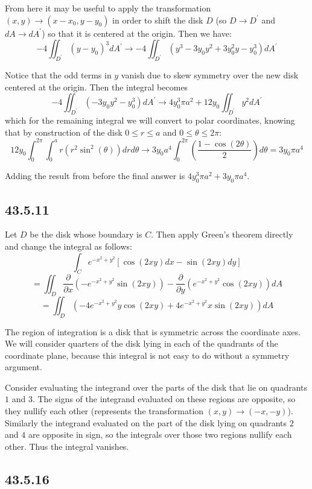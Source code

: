 \documentclass{article}
\begin{document}
From here it may be useful to apply the transformation $(x,y)\to (x-x_0,y-y_0)$ in order to shift the disk $D$ (so $D\to D^{\prime}$ and $dA \to dA^{\prime}$) so that it is centered at the origin. Then we have:
$$-4\iint_{D^{\prime}} (y-y_0)^3dA^{\prime} \to -4\iint_{D^{\prime}}(y^3 - 3 y_0 y^2 + 3 y_0^2 y - y_0^3)dA^{\prime}$$

Notice that the odd terms in $y$ vanish due to skew symmetry over the new disk centered at the origin. Then the integral becomes $$-4\iint_{D^{\prime}}(- 3 y_0 y^2 - y_0^3)dA^{\prime} \to 4y_0^3\pi a^2 + 12y_0\iint_{D^{\prime}} y^2 dA^{\prime}$$
which for the remaining integral we will convert to polar coordinates, knowing that by construction of the disk $0\leq r \leq a$ and $0 \leq \theta \leq 2\pi$:
$$12y_0\int_0^{2\pi}\int_0^a r\left(r^2\sin^2(\theta)\right)drd\theta \to 3y_0a^4\int_0^{2\pi}\left(\frac{1-\cos(2\theta)}{2}\right)d\theta = 3y_0\pi a^4$$

Adding the result from before the final answer is $4y_0^3\pi a^2 + 3y_0\pi a^4$.

\subsection{43.5.11}

Let $D$ be the disk whose boundary is $C$. Then apply Green's theorem directly and change the integral as follows:
$$\int_C e^{-x^2+y^2}\left[\cos(2xy)dx - \sin(2xy)dy\right]$$
$$ = \iint_D \frac{\partial}{\partial x}\left(-e^{-x^2+y^2}\sin(2xy)\right) - \frac{\partial}{\partial y}\left( e^{-x^2+y^2}\cos(2xy)\right)dA$$
$$= \iint_D \left(-4 e^{-x^2 + y^2} y \cos(2 x y) + 4 e^{-x^2 + y^2} x \sin(2 x y)\right)dA$$

The region of integration is a disk that is symmetric across the coordinate axes. We will consider quarters of the disk lying in each of the quadrants of the coordinate plane, because this integral is not easy to do without a symmetry argument.

Consider evaluating the integrand over the parts of the disk that lie on quadrants $1$ and $3$. The signs of the integrand evaluated on these regions are opposite, so they nullify each other (represents the transformation $(x,y)\to (-x,-y)$). Similarly the integrand evaluated on the part of the disk lying on quadrants $2$ and $4$ are opposite in sign, so the integrals over those two regions nullify each other. Thus the integral vanishes.

\subsection{43.5.16}
\end{document}
